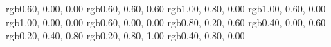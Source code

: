 %
%
%
\RequirePackage{xcolor}
%
       {rgb}{0.60, 0.00, 0.00} %
      {rgb}{0.60, 0.60, 0.60} %
% 
    {rgb}{1.00, 0.80, 0.00} %
    {rgb}{1.00, 0.60, 0.00} %
  {rgb}{1.00, 0.00, 0.00} %
     {rgb}{0.60, 0.00, 0.00} %
    {rgb}{0.80, 0.20, 0.60} %
    {rgb}{0.40, 0.00, 0.60} %
  {rgb}{0.20, 0.40, 0.80} %
 {rgb}{0.20, 0.80, 1.00} %
 {rgb}{0.40, 0.80, 0.00} %

